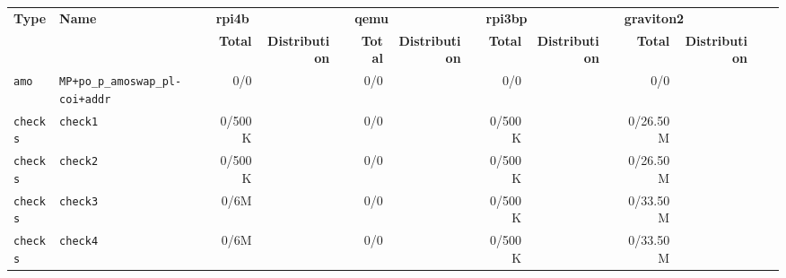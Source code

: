 \begin{tabular}{l l  | r r l | r r l | r r l | r r l l}
   \textbf{Type}       & \textbf{Name}                                              & \multicolumn{3}{l}{\textbf{rpi4b}}                         & \multicolumn{3}{l}{\textbf{qemu}}        & \multicolumn{3}{l}{\textbf{rpi3bp}}                         & \multicolumn{3}{l}{\textbf{graviton2}}                         & \\
                       &                                                            & \textbf{Total} & \textbf{Distribution} &                   & \textbf{Total} & \textbf{Distribution} &  & \textbf{Total} & \textbf{Distribution} &                   & \textbf{Total} & \textbf{Distribution} &                   & \\
            \verb|amo| &                         \verb|MP+po_p_amoswap_pl-coi+addr| &            0/0 &                       &                   &            0/0 &                       &  &            0/0 &                       &                   &            0/0 &                       &                   & \\ \hline 
         \verb|checks| &                                              \verb|check1| &         0/500K &                       &                   &            0/0 &                       &  &         0/500K &                       &                   &       0/26.50M &                       &                   & \\ \hline 
         \verb|checks| &                                              \verb|check2| &         0/500K &                       &                   &            0/0 &                       &  &         0/500K &                       &                   &       0/26.50M &                       &                   & \\ \hline 
         \verb|checks| &                                              \verb|check3| &           0/6M &                       &                   &            0/0 &                       &  &         0/500K &                       &                   &       0/33.50M &                       &                   & \\ \hline 
         \verb|checks| &                                              \verb|check4| &           0/6M &                       &                   &            0/0 &                       &  &         0/500K &                       &                   &       0/33.50M &                       &                   & \\ \hline 

\end{tabular}
